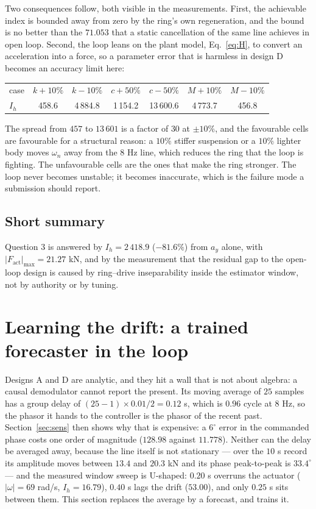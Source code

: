 \documentclass[12pt]{apmcmthesis}
\begin{document}
Two consequences follow, both visible in the measurements. First, the achievable index is bounded
away from zero by the ring's own regeneration, and the bound is no better than the $71.053$ that a
static cancellation of the same line achieves in open loop. Second, the loop leans on the plant
model, Eq.~\eqref{eq:H}, to convert an acceleration into a force, so a parameter error that is
harmless in design D becomes an accuracy limit here:
\begin{center}\small\setlength{\tabcolsep}{5pt}
\begin{tabular}{@{}lcccccc@{}}
\toprule
case & $k+10\%$ & $k-10\%$ & $c+50\%$ & $c-50\%$ & $M+10\%$ & $M-10\%$ \\
$I_h$ & 458.6 & 4\,884.8 & 1\,154.2 & 13\,600.6 & 4\,773.7 & 456.8 \\
\bottomrule
\end{tabular}\end{center}
The spread from $457$ to $13\,601$ is a factor of $30$ at $\pm10\%$, and the favourable cells are
favourable for a structural reason: a $10\%$ stiffer suspension or a $10\%$ lighter body moves
$\omega_n$ away from the $8$ Hz line, which reduces the ring that the loop is fighting. The
unfavourable cells are the ones that make the ring stronger. The loop never becomes unstable; it
becomes inaccurate, which is the failure mode a submission should report.

\subsection{Short summary}
Question 3 is answered by $I_h=2\,418.9$ ($-81.6\%$) from $a_y$ alone, with
$|F_{\text{act}}|_{\max}=21.27$ kN, and by the measurement that the residual gap to the open-loop
design is caused by ring--drive inseparability inside the estimator window, not by authority or by
tuning.

\section{Learning the drift: a trained forecaster in the loop}
\label{sec:learn}
Designs A and D are analytic, and they hit a wall that is not about algebra: a causal demodulator
cannot report the present. Its moving average of $25$ samples has a group delay of
$(25-1)\times0.01/2=0.12$ s, which is $0.96$ cycle at $8$ Hz, so the phasor it hands to the
controller is the phasor of the recent past. Section~\ref{sec:sens} then shows why that is
expensive: a $6^\circ$ error in the commanded phase costs one order of magnitude
($128.98$ against $11.778$). Neither can the delay be averaged away, because the line itself is not
stationary --- over the $10$ s record its amplitude moves between $13.4$ and $20.3$ kN and its
phase peak-to-peak is $33.4^\circ$ --- and the measured window sweep is U-shaped: $0.20$ s overruns
the actuator ($|{\omega}|=69$ rad/s, $I_h=16.79$), $0.40$ s lags the drift ($53.00$), and only
$0.25$ s sits between them. This section replaces the average by a forecast, and trains it.
\end{document}

